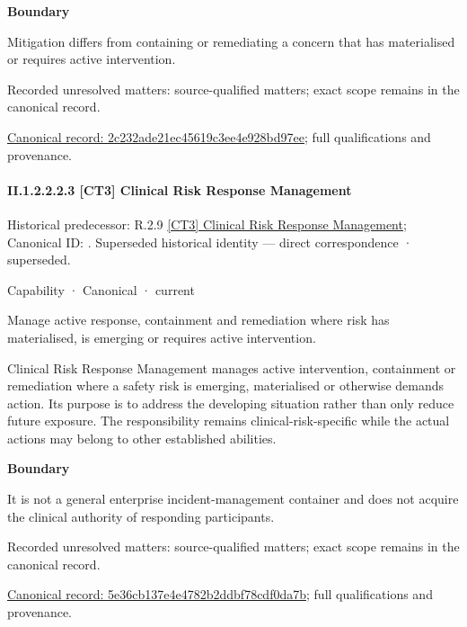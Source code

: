 \textbf{Boundary}



Mitigation differs from containing or remediating a concern that has materialised or requires active intervention.


{\small Recorded unresolved matters: source-qualified matters; exact scope remains in the canonical record.}\par
{\footnotesize \href{../../../../../../../continuum/strategy/capability/2c232ade21ec45619c3ee4e928bd97ee.md}{Canonical record: 2c232ade21ec45619c3ee4e928bd97ee}; full qualifications and provenance.}\par
\paragraph*{II.1.2.2.2.3 [CT3] Clinical Risk Response Management}
\label{navigation:II.1.2.2.2.3}

{\small Historical predecessor: R.2.9 \hyperref[element:20f719ab4b6741b393ef570b4d1b05df]{[CT3] Clinical Risk Response Management}; Canonical ID: \texttt{}. Superseded historical identity — direct correspondence · superseded.}\par
\label{element:5e36cb137e4e4782b2ddbf78cdf0da7b}
{\small Capability · Canonical · current}\par

Manage active response, containment and remediation where risk has materialised, is emerging or requires active intervention.



Clinical Risk Response Management manages active intervention, containment or remediation where a safety risk is emerging, materialised or otherwise demands action. Its purpose is to address the developing situation rather than only reduce future exposure. The responsibility remains clinical-risk-specific while the actual actions may belong to other established abilities.



\textbf{Boundary}



It is not a general enterprise incident-management container and does not acquire the clinical authority of responding participants.


{\small Recorded unresolved matters: source-qualified matters; exact scope remains in the canonical record.}\par
{\footnotesize \href{../../../../../../../continuum/strategy/capability/5e36cb137e4e4782b2ddbf78cdf0da7b.md}{Canonical record: 5e36cb137e4e4782b2ddbf78cdf0da7b}; full qualifications and provenance.}\par
